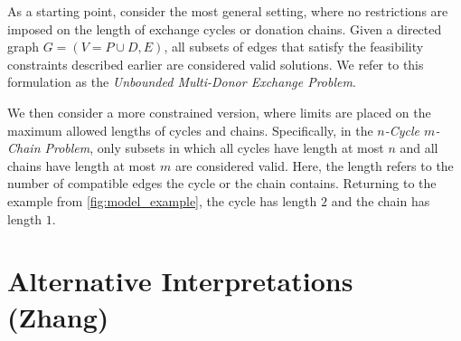 As a starting point, consider the most general setting, where no restrictions are imposed on the length of exchange cycles or donation chains. Given a directed graph $G = (V = P \cup D, E)$, all subsets of edges that satisfy the feasibility constraints described earlier are considered valid solutions. We refer to this formulation as the \textit{Unbounded Multi-Donor Exchange Problem}.

We then consider a more constrained version, where limits are placed on the maximum allowed lengths of cycles and chains. Specifically, in the \textit{$n$-Cycle $m$-Chain Problem}, only subsets in which all cycles have length at most $n$ and all chains have length at most $m$ are considered valid. Here, the length refers to the number of compatible edges the cycle or the chain contains. Returning to the example from \autoref{fig:model_example}, the cycle has length $2$ and the chain has length $1$.



\section{Alternative Interpretations (Zhang)}





